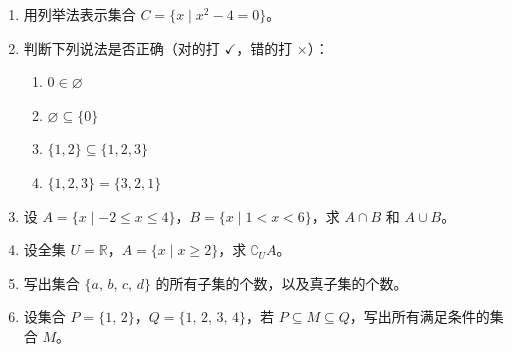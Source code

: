 \documentclass[12pt, a4paper]{ctexart}
\begin{document}
\begin{enumerate}[leftmargin=2.5em]
  \item 用列举法表示集合 $C = \{x \mid x^2 - 4 = 0\}$。

  \item 判断下列说法是否正确（对的打 $\checkmark$，错的打 $\times$）：
  \begin{enumerate}[label=(\arabic*)]
    \item $0 \in \varnothing$
    \item $\varnothing \subseteq \{0\}$
    \item $\{1,2\} \subseteq \{1,2,3\}$
    \item $\{1,2,3\} = \{3,2,1\}$
  \end{enumerate}

  \item 设 $A = \{x \mid -2 \leqslant x \leqslant 4\}$，$B = \{x \mid 1 < x < 6\}$，求 $A \cap B$ 和 $A \cup B$。

  \item 设全集 $U = \mathbb{R}$，$A = \{x \mid x \geqslant 2\}$，求 $\complement_U A$。

  \item 写出集合 $\{a,\, b,\, c,\, d\}$ 的所有子集的个数，以及真子集的个数。

  \item 设集合 $P = \{1,\, 2\}$，$Q = \{1,\, 2,\, 3,\, 4\}$，若 $P \subseteq M \subseteq Q$，写出所有满足条件的集合 $M$。
\end{enumerate}

\vspace{10pt}
\end{document}
